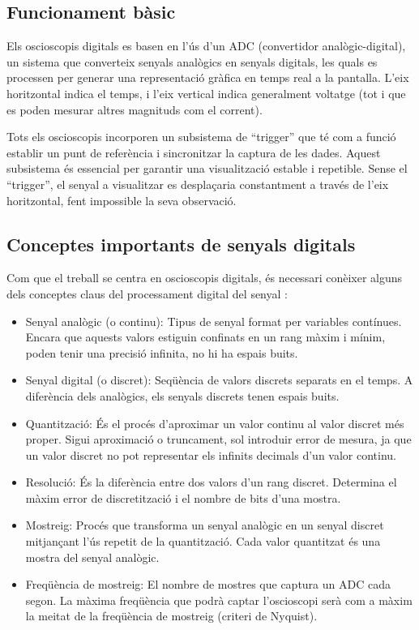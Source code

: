 \documentclass{tfgitic}[2023/06/30]
\begin{document}
\subsection{Funcionament bàsic}
\label{subsec:funcionament-bàsic}

Els osci\lgem oscopis digitals es basen en l'ús d'un ADC (convertidor
analògic-digital), un sistema que converteix senyals analògics en
senyals digitals, les quals es processen per generar una representació
gràfica en temps real a la pantalla. L'eix horitzontal indica el
temps, i l'eix vertical indica generalment voltatge (tot i que es
poden mesurar altres magnituds com el corrent).

Tots els osci\lgem oscopis incorporen un subsistema de ``trigger''
\cite{funcionament-trigger} que té com a funció establir un punt de
referència i sincronitzar la captura de les dades. Aquest subsistema
és essencial per garantir una visualització estable i repetible. Sense
el ``trigger'', el senyal a visualitzar es desplaçaria constantment a
través de l'eix horitzontal, fent impossible la seva observació.

\subsection{Conceptes importants de senyals digitals}
\label{subsec:conceptes-pds}

Com que el treball se centra en osci\lgem oscopis digitals, és
necessari conèixer alguns dels conceptes claus del processament
digital del senyal \cite{llibre-pds}:

\begin{itemize}
	\item Senyal analògic (o continu): Tipus de senyal format per
          variables contínues. Encara que aquests valors estiguin
          confinats en un rang màxim i mínim, poden tenir una precisió
          infinita, no hi ha espais buits.
	\item Senyal digital (o discret): Seqüència de valors discrets
          separats en el temps. A diferència dels analògics, els
          senyals discrets tenen espais buits.
	\item Quantització: És el procés d'aproximar un valor continu
          al valor discret més proper. Sigui aproximació o truncament,
          sol introduir error de mesura, ja que un valor discret no
          pot representar els infinits decimals d'un valor continu.
	\item Resolució: És la diferència entre dos valors d'un rang
          discret. Determina el màxim error de discretització i el
          nombre de bits d'una mostra.
	\item Mostreig: Procés que transforma un senyal analògic en un
          senyal discret mitjançant l'ús repetit de la quantització.
          Cada valor quantitzat és una mostra del senyal analògic.
	\item Freqüència de mostreig: El nombre de mostres que captura
          un ADC cada segon. La màxima freqüència que podrà captar
          l'osci\lgem oscopi serà com a màxim la meitat de la
          freqüència de mostreig (criteri de Nyquist).
\end{itemize}
\end{document}
